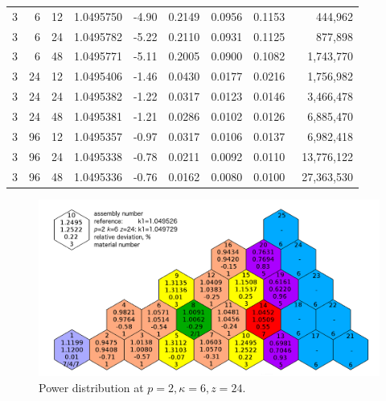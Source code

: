 \documentclass[runningheads,a4paper]{llncs}
\begin{document}
\begin{table}[htp]
\begin{center}
\begin{tabular}{rrrrrrrrr}
\rowcolor{col3}
3& 6& 12& 1.0495750& -4.90& 0.2149& 0.0956& 0.1153& 444,962 \\
\rowcolor{col2}
3& 6& 24& 1.0495782& -5.22& 0.2110& 0.0931& 0.1125& 877,898  \\
\rowcolor{col1}
3& 6& 48& 1.0495771& -5.11& 0.2005& 0.0900& 0.1082& 1,743,770\\
\rowcolor{col3}
3& 24& 12& 1.0495406& -1.46& 0.0430& 0.0177& 0.0216& 1,756,982\\
\rowcolor{col2}
3& 24& 24& 1.0495382& -1.22& 0.0317& 0.0123& 0.0146& 3,466,478\\
\rowcolor{col1}
3& 24& 48& 1.0495381& -1.21& 0.0286& 0.0102& 0.0126& 6,885,470\\
\rowcolor{col3}
3& 96& 12& 1.0495357& -0.97& 0.0317& 0.0106& 0.0137& 6,982,418\\
\rowcolor{col2}
3& 96& 24& 1.0495338& -0.78& 0.0211& 0.0092& 0.0110& 13,776,122\\
\rowcolor{col1}
3& 96& 48& 1.0495336& -0.76& 0.0162& 0.0080& 0.0100& ~27,363,530\\
\end{tabular}
\end{center}
\end{table}

\begin{figure}[htp]
  \begin{center}
    \includegraphics[width=1\linewidth] {power.png}
	\caption{Power distribution at $p=2, \kappa=6, z=24$.}
	\label{fig:3}
  \end{center}
\end{figure}
\end{document}
